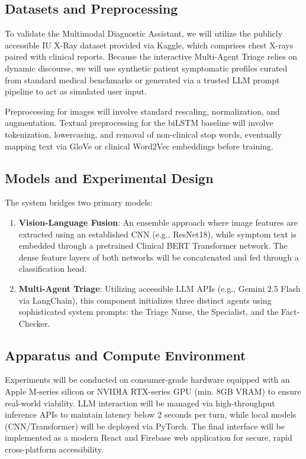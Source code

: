 \documentclass[11pt,a4paper]{article}
\begin{document}
\subsection{Datasets and Preprocessing}
To validate the Multimodal Diagnostic Assistant, we will utilize the publicly accessible IU X-Ray dataset provided via Kaggle, which comprises chest X-rays paired with clinical reports. Because the interactive Multi-Agent Triage relies on dynamic discourse, we will use synthetic patient symptomatic profiles curated from standard medical benchmarks or generated via a trusted LLM prompt pipeline to act as simulated user input. 

Preprocessing for images will involve standard rescaling, normalization, and augmentation. Textual preprocessing for the biLSTM baseline will involve tokenization, lowercasing, and removal of non-clinical stop words, eventually mapping text via GloVe or clinical Word2Vec embeddings before training.

\subsection{Models and Experimental Design}
The system bridges two primary models:
\begin{enumerate}[label=\textbf{\arabic*.}]
    \item \textbf{Vision-Language Fusion}: An ensemble approach where image features are extracted using an established CNN (e.g., ResNet18), while symptom text is embedded through a pretrained Clinical BERT Transformer network. The dense feature layers of both networks will be concatenated and fed through a classification head.
    \item \textbf{Multi-Agent Triage}: Utilizing accessible LLM APIs (e.g., Gemini 2.5 Flash via LangChain), this component initializes three distinct agents using sophisticated system prompts: the Triage Nurse, the Specialist, and the Fact-Checker. 
\end{enumerate}

\subsection{Apparatus and Compute Environment}
Experiments will be conducted on consumer-grade hardware equipped with an Apple M-series silicon or NVIDIA RTX-series GPU (min. 8GB VRAM) to ensure real-world viability. LLM interaction will be managed via high-throughput inference APIs to maintain latency below 2 seconds per turn, while local models (CNN/Transformer) will be deployed via PyTorch. The final interface will be implemented as a modern React and Firebase web application for secure, rapid cross-platform accessibility.
\end{document}
